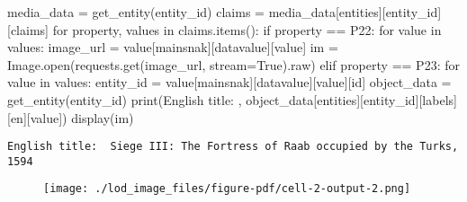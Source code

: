 \documentclass[
  letterpaper,
  DIV=11,
  numbers=noendperiod]{scrreprt}
\newenvironment{Shaded}{\begin{snugshade}}{\end{snugshade}}
\newcommand{\BuiltInTok}[1]{\textcolor[rgb]{0.00,0.23,0.31}{#1}}
\newcommand{\ControlFlowTok}[1]{\textcolor[rgb]{0.00,0.23,0.31}{#1}}
\newcommand{\KeywordTok}[1]{\textcolor[rgb]{0.00,0.23,0.31}{#1}}
\newcommand{\NormalTok}[1]{\textcolor[rgb]{0.00,0.23,0.31}{#1}}
\newcommand{\OperatorTok}[1]{\textcolor[rgb]{0.37,0.37,0.37}{#1}}
\newcommand{\StringTok}[1]{\textcolor[rgb]{0.13,0.47,0.30}{#1}}
\newcommand{\VariableTok}[1]{\textcolor[rgb]{0.07,0.07,0.07}{#1}}
\begin{document}
\begin{Shaded}
\begin{Highlighting}[]
\NormalTok{media\_data }\OperatorTok{=}\NormalTok{ get\_entity(entity\_id)}
\NormalTok{claims }\OperatorTok{=}\NormalTok{ media\_data[}\StringTok{\textquotesingle{}entities\textquotesingle{}}\NormalTok{][entity\_id][}\StringTok{\textquotesingle{}claims\textquotesingle{}}\NormalTok{]}
\ControlFlowTok{for} \BuiltInTok{property}\NormalTok{, values }\KeywordTok{in}\NormalTok{ claims.items():}
    \ControlFlowTok{if} \BuiltInTok{property} \OperatorTok{==} \StringTok{\textquotesingle{}P22\textquotesingle{}}\NormalTok{:}
        \ControlFlowTok{for}\NormalTok{ value }\KeywordTok{in}\NormalTok{ values:}
\NormalTok{            image\_url }\OperatorTok{=}\NormalTok{ value[}\StringTok{\textquotesingle{}mainsnak\textquotesingle{}}\NormalTok{][}\StringTok{\textquotesingle{}datavalue\textquotesingle{}}\NormalTok{][}\StringTok{\textquotesingle{}value\textquotesingle{}}\NormalTok{]}
\NormalTok{            im }\OperatorTok{=}\NormalTok{ Image.}\BuiltInTok{open}\NormalTok{(requests.get(image\_url, stream}\OperatorTok{=}\VariableTok{True}\NormalTok{).raw)}
    \ControlFlowTok{elif} \BuiltInTok{property} \OperatorTok{==} \StringTok{\textquotesingle{}P23\textquotesingle{}}\NormalTok{:}
        \ControlFlowTok{for}\NormalTok{ value }\KeywordTok{in}\NormalTok{ values:}
\NormalTok{            entity\_id }\OperatorTok{=}\NormalTok{ value[}\StringTok{\textquotesingle{}mainsnak\textquotesingle{}}\NormalTok{][}\StringTok{\textquotesingle{}datavalue\textquotesingle{}}\NormalTok{][}\StringTok{\textquotesingle{}value\textquotesingle{}}\NormalTok{][}\StringTok{\textquotesingle{}id\textquotesingle{}}\NormalTok{]}
\NormalTok{            object\_data }\OperatorTok{=}\NormalTok{ get\_entity(entity\_id)}
\BuiltInTok{print}\NormalTok{(}\StringTok{\textquotesingle{}English title: \textquotesingle{}}\NormalTok{, object\_data[}\StringTok{\textquotesingle{}entities\textquotesingle{}}\NormalTok{][entity\_id][}\StringTok{\textquotesingle{}labels\textquotesingle{}}\NormalTok{][}\StringTok{\textquotesingle{}en\textquotesingle{}}\NormalTok{][}\StringTok{\textquotesingle{}value\textquotesingle{}}\NormalTok{])}
\NormalTok{display(im)}
\end{Highlighting}
\end{Shaded}

\begin{verbatim}
English title:  Siege III: The Fortress of Raab occupied by the Turks, 1594
\end{verbatim}

\begin{figure}[H]

{\centering \texttt{[image: ./lod\_image\_files/figure-pdf/cell-2-output-2.png]}

}

\end{figure}
\end{document}
